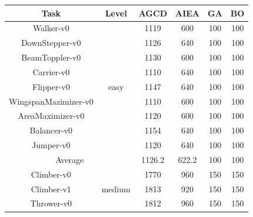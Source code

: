 \documentclass{article}
\begin{document}
    \begin{table}[H]
        \centering
        \small
        \begin{tabular}{cccccc}
            \toprule \textbf{Task}               & \textbf{Level}          & \textbf{AGCD} & \textbf{AIEA} & \textbf{GA} & \textbf{BO} \\
            \midrule Walker-v0                   & \multirow{9}{*}{easy}   & 1119          & 600           & 100         & 100         \\
            DownStepper-v0                       &                         & 1126          & 640           & 100         & 100         \\
            BeamToppler-v0                       &                         & 1130          & 600           & 100         & 100         \\
            Carrier-v0                           &                         & 1110          & 640           & 100         & 100         \\
            Flipper-v0                           &                         & 1147          & 640           & 100         & 100         \\
            WingspanMazimizer-v0                 &                         & 1110          & 600           & 100         & 100         \\
            AreaMaximizer-v0                     &                         & 1120          & 600           & 100         & 100         \\
            Balancer-v0                          &                         & 1154          & 640           & 100         & 100         \\
            Jumper-v0                            &                         & 1120          & 640           & 100         & 100         \\
            \midrule \multicolumn{2}{c}{Average} & 1126.2                  & 622.2         & 100           & 100          \\
            \midrule Climber-v0                  & \multirow{9}{*}{medium} & 1770          & 960           & 150         & 150         \\
            Climber-v1                           &                         & 1813          & 920           & 150         & 150         \\
            Thrower-v0                           &                         & 1812          & 960           & 150         & 150         \\

\end{tabular}
\end{table}
\end{document}
